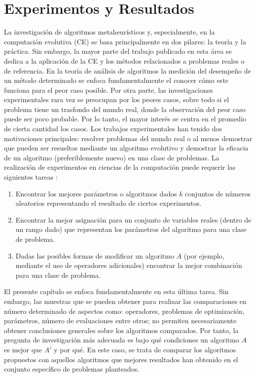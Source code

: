 \chapter{Experimentos y Resultados} \label{Chapter7}

La investigación de algoritmos metaheurísticos y, especialmente, en la computación evolutiva (CE) se basa principalmente en dos pilares: la teoría y la práctica. Sin embargo, la mayor parte del trabajo publicado en esta área se dedica a la aplicación de la CE y los métodos relacionados a problemas reales o de referencia. En la teoría de análisis de algoritmos la medición del desempeño de un método determinado se enfoca fundamentalmente el conocer cómo este funciona para el peor caso posible. Por otra parte, las investigaciones experimentales rara vez se preocupan por los peores casos, sobre todo si el problema tiene un trasfondo del mundo real, donde la observación del peor caso puede ser poco probable. Por lo tanto, el mayor interés se centra en el promedio de cierta cantidad los casos. Los trabajos experimentales han tenido dos motivaciones principales: resolver problemas del mundo real o al menos demostrar que pueden ser resueltos mediante un algoritmo evolutivo y demostrar la eficacia de un algoritmo (preferiblemente nuevo) en una clase de problemas. La realización de experimentos en ciencias de la computación puede requerir las siguientes tareas \cite{BartzBeielstein2014ExperimentalAO}:
\begin{enumerate}
	\item Encontrar los mejores parámetros o algoritmos dados $k$ conjuntos de números aleatorios representando el resultado de ciertos experimentos.
	\item  Encontrar la mejor asignación para un conjunto de variables reales (dentro de un rango dado) que representan los parámetros del algoritmo para una clase de problema.
	\item Dadas las posibles formas de modificar un algoritmo $A$ (por ejemplo, mediante el uso de operadores adicionales) encontrar la mejor combinación para una clase de problema.
\end{enumerate}
El presente capítulo se enfoca fundamentalmente en esta última tarea. Sin embargo, las muestras que se pueden obtener para realizar las comparaciones en número determinado de aspectos como: operadores, problemas de optimización, parámetros, número de evaluaciones entre otros; no permiten necesariamente obtener conclusiones generales sobre los algoritmos comparados. Por tanto, la pregunta de investigación más adecuada es bajo qué condiciones  un algoritmo $A$ es mejor que $A'$ y por qué. En este caso, se trata de comparar los algoritmos propuestos con aquellos algoritmos que mejores resultados han obtenido en el conjunto específico de problemas planteados. 

